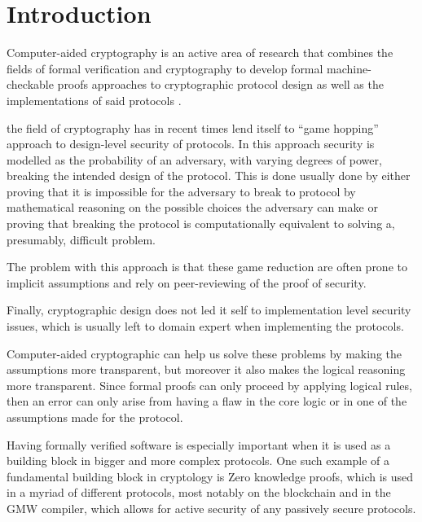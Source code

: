 \chapter{Introduction}
\label{ch:intro}

Computer-aided cryptography is an active area of research that combines the
fields of formal verification and cryptography to develop
formal machine-checkable proofs approaches to cryptographic protocol design as
well as the implementations of said protocols \cite{SOK:CAC}.


the field of cryptography has in recent times lend itself to ``game hopping''
approach to design-level security of protocols. In this approach security is
modelled as the probability of an adversary, with varying degrees of power,
breaking the intended design of the protocol. This is done usually done by
either proving that it is impossible for the adversary to break to protocol by
mathematical reasoning on the possible choices the adversary can make or
proving that breaking the protocol is computationally equivalent to
solving a, presumably, difficult problem.

The problem with this approach is that these game reduction are often prone to
implicit assumptions and rely on peer-reviewing of the proof of security.

Finally, cryptographic design does not led it self to implementation level
security issues, which is usually left to domain expert when implementing the
protocols.

Computer-aided cryptographic can help us solve these problems by making the
assumptions more transparent, but moreover it also makes the logical reasoning
more transparent. Since formal proofs can only proceed by applying logical
rules, then an error can only arise from having a flaw in the core logic or in
one of the assumptions made for the protocol.


Having formally verified software is especially important when it is used as a
building block in bigger and more complex protocols. One such example of a
fundamental building block in cryptology is Zero knowledge proofs, which is used in
a myriad of different protocols, most notably on the blockchain and in the GMW compiler, which allows for active security of any passively secure protocols.

